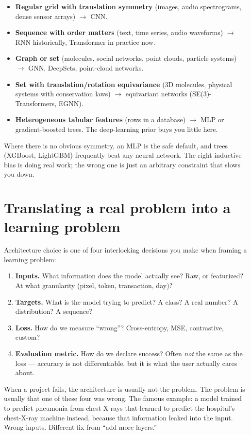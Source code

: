 \begin{itemize}
  \item \textbf{Regular grid with translation symmetry} (images, audio spectrograms, dense sensor arrays) $\to$ CNN.
  \item \textbf{Sequence with order matters} (text, time series, audio waveforms) $\to$ RNN historically, Transformer in practice now.
  \item \textbf{Graph or set} (molecules, social networks, point clouds, particle systems) $\to$ GNN, DeepSets, point-cloud networks.
  \item \textbf{Set with translation/rotation equivariance} (3D molecules, physical systems with conservation laws) $\to$ equivariant networks (SE(3)-Transformers, EGNN).
  \item \textbf{Heterogeneous tabular features} (rows in a database) $\to$ MLP or gradient-boosted trees. The deep-learning prior buys you little here.
\end{itemize}

Where there is no obvious symmetry, an MLP is the safe default, and trees (XGBoost, LightGBM) frequently beat any neural network. The right inductive bias is doing real work; the wrong one is just an arbitrary constraint that slows you down.

\section{Translating a real problem into a learning problem}

Architecture choice is one of four interlocking decisions you make when framing a learning problem:

\begin{enumerate}
  \item \textbf{Inputs.} What information does the model actually see? Raw, or featurized? At what granularity (pixel, token, transaction, day)?
  \item \textbf{Targets.} What is the model trying to predict? A class? A real number? A distribution? A sequence?
  \item \textbf{Loss.} How do we measure ``wrong''? Cross-entropy, MSE, contrastive, custom?
  \item \textbf{Evaluation metric.} How do we declare success? Often \emph{not} the same as the loss --- accuracy is not differentiable, but it is what the user actually cares about.
\end{enumerate}

When a project fails, the architecture is usually not the problem. The problem is usually that one of these four was wrong. The famous example: a model trained to predict pneumonia from chest X-rays that learned to predict the hospital's chest-X-ray machine instead, because that information leaked into the input. Wrong inputs. Different fix from ``add more layers.''

